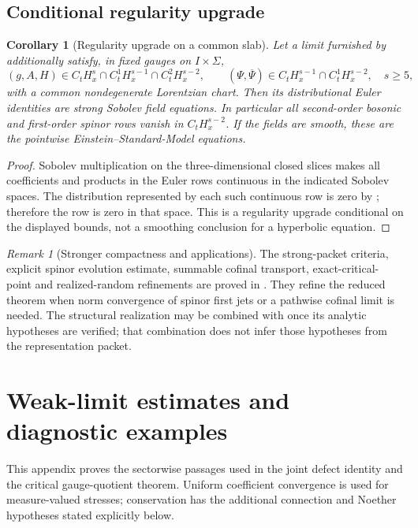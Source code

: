 \documentclass[11pt]{article}
\numberwithin{equation}{section}
\newtheorem{corollary}[corollary]{Corollary}
\theoremstyle{definition}
\theoremstyle{remark}
\newtheorem{remark}[remark]{Remark}
\newcommand{\bPsi}{\overline\Psi}
\begin{document}
\subsection{Conditional regularity upgrade}

\begin{corollary}[Regularity upgrade on a common slab]
\label{cor:strong-solution-upgrade}
Let a limit furnished by  additionally satisfy,
in fixed gauges on $I\times\Sigma$,
\[
 (g,A,H)\in C_tH_x^s\cap C_t^1H_x^{s-1}\cap C_t^2H_x^{s-2},
 \qquad
 (\Psi,\bPsi)\in C_tH_x^{s-1}\cap C_t^1H_x^{s-2},\quad s\ge5,
\]
with a common nondegenerate Lorentzian chart.  Then its distributional Euler
identities are strong Sobolev field equations.  In particular all second-order
bosonic and first-order spinor rows vanish in $C_tH_x^{s-2}$.
If the fields are smooth, these are the pointwise Einstein--Standard-Model
equations.
\end{corollary}
\begin{proof}
Sobolev multiplication on the three-dimensional closed slices makes all
coefficients and products in the Euler rows continuous in the indicated
Sobolev spaces.  The distribution represented by each such continuous row
is zero by ; therefore the row is zero in that
space.  This is a regularity upgrade conditional on the displayed bounds,
not a smoothing conclusion for a hyperbolic equation.
\end{proof}

\begin{remark}[Stronger compactness and applications]
The strong-packet criteria, explicit spinor evolution estimate, summable
cofinal transport, exact-critical-point and realized-random refinements are
proved in .  They refine the reduced theorem when
norm convergence of spinor first jets or a pathwise cofinal limit is needed.
The structural realization  may be combined with
 once its analytic hypotheses are verified; that
combination does not infer those hypotheses from the representation packet.
\end{remark}

\section{Weak-limit estimates and diagnostic examples}
\label{app:weak-limit-estimates}

This appendix proves the sectorwise passages used in the joint defect
identity and the critical gauge-quotient theorem. Uniform coefficient
convergence is used for measure-valued stresses; conservation has the
additional connection and Noether hypotheses stated explicitly below.
\end{document}
